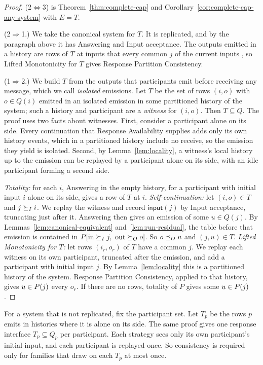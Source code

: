 \begin{proof}
(2$\Leftrightarrow$3) is Theorem~\ref{thm:complete-cap} and
Corollary~\ref{cor:complete-cap-any-system} with $E=T$.

(2$\Rightarrow$1.)  We take the canonical system for $T$.  It is replicated, and by the
paragraph above it has Answering and Input acceptance.  The outputs emitted in
a history are rows of $T$ at inputs that every common \indesc $j$ of the
current inputs \inrel, so Lifted Monotonicity for $T$ gives Response Partition
Consistency.

(1$\Rightarrow$2.)  We build $T$ from the outputs that participants emit
before receiving any message, which we call \emph{isolated} emissions.  Let
$T$ be the set of rows $(i,o)$ with $o\in Q(i)$ emitted in an isolated
emission in some partitioned history of the system; such a history and
participant are a \emph{witness} for $(i,o)$.  Then $T\subseteq Q$.  The
proof uses two facts about witnesses.  First, consider a participant alone on
its side.  Every continuation that Response Availability supplies adds only
its own history events, which in a partitioned history include no receive, so
the emission they yield is isolated.  Second, by Lemma~\ref{lem:locality}, a
witness's local history up to the emission can be replayed by a participant
alone on its side, with an idle participant forming a second side.

\emph{Totality:} for each $i$, Answering in the empty history, for a
participant with initial input $i$ alone on its side, gives a row of $T$ at
$i$.  \emph{Self-continuation:} let $(i,o)\in T$ and $j\succeq_I i$.  We replay
the witness and record $\mathsf{input}(j)$ by Input acceptance, truncating
just after it.  Answering then gives an emission of some $u\in Q(j)$.  By
Lemmas~\ref{lem:canonical-equivalent} and~\ref{lem:run-residual}, the table
before that emission is contained in $P[\mathrm{in}\succeq_I j,\
\mathrm{out}\succeq_O o]$.  So $o\preceq_O u$ and $(j,u)\in T$.
\emph{Lifted Monotonicity for $T$:} let rows $(i_r,o_r)$ of $T$ have a common
\indesc $j$.  We replay each witness on its own participant, truncated after
the emission, and add a participant with initial input $j$.  By
Lemma~\ref{lem:locality} this is a partitioned history of the system.
Response Partition Consistency, applied to that history, gives
$u\in P(j)$ \outrelpart every $o_r$.  If there are no rows, totality of
$P$ gives some $u\in P(j)$.
\end{proof}

\begin{remark}
For a system that is not replicated, fix the participant set.  Let $T_p$ be
the rows $p$ emits in histories where it is alone on its side.  The same proof
gives one response interface $T_p\subseteq Q_p$ per participant.  Each
strategy sees only its own participant's initial input, and each participant
is replayed once.  So consistency is required only for families that draw on
each $T_p$ at most once.
\end{remark}

